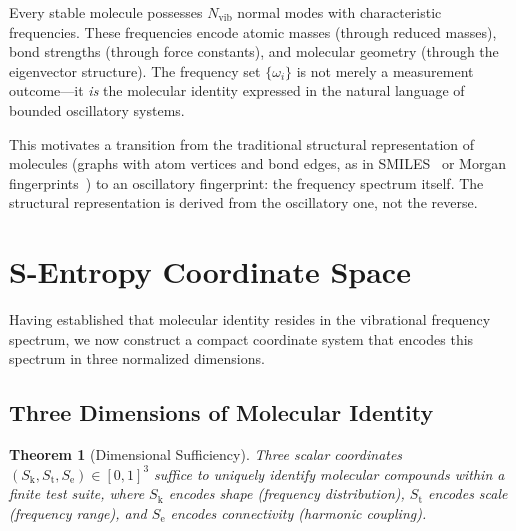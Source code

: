 \documentclass[11pt,twocolumn,a4paper]{article}
\newtheorem{theorem}{Theorem}[section]
\theoremstyle{definition}
\theoremstyle{remark}
\newcommand{\Sk}{S_{\mathrm{k}}}
\newcommand{\St}{S_{\mathrm{t}}}
\newcommand{\Se}{S_{\mathrm{e}}}
\newcommand{\Nvib}{N_{\mathrm{vib}}}
\begin{document}
Every stable molecule possesses $\Nvib$ normal modes with characteristic frequencies. These frequencies encode atomic masses (through reduced masses), bond strengths (through force constants), and molecular geometry (through the eigenvector structure). The frequency set $\{\omega_i\}$ is not merely a measurement outcome---it \emph{is} the molecular identity expressed in the natural language of bounded oscillatory systems.

This motivates a transition from the traditional structural representation of molecules (graphs with atom vertices and bond edges, as in SMILES~\citep{weininger1988} or Morgan fingerprints~\citep{morgan1965, rogers2010}) to an oscillatory fingerprint: the frequency spectrum itself. The structural representation is derived from the oscillatory one, not the reverse.

\section{S-Entropy Coordinate Space}
\label{sec:sentropy}

Having established that molecular identity resides in the vibrational frequency spectrum, we now construct a compact coordinate system that encodes this spectrum in three normalized dimensions.

\subsection{Three Dimensions of Molecular Identity}
\label{sec:three-dimensions}

\begin{theorem}[Dimensional Sufficiency]
\label{thm:dimensional-sufficiency}
Three scalar coordinates $(\Sk, \St, \Se) \in [0,1]^3$ suffice to uniquely identify molecular compounds within a finite test suite, where $\Sk$ encodes shape (frequency distribution), $\St$ encodes scale (frequency range), and $\Se$ encodes connectivity (harmonic coupling).
\end{theorem}
\end{document}
